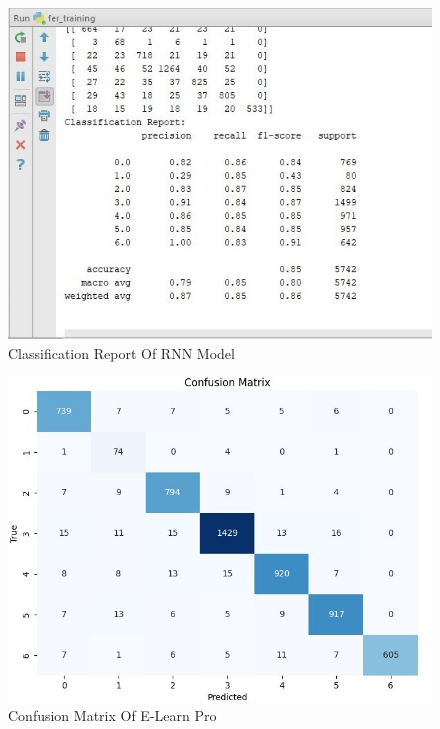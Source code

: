 \begin{figure}[!ht]
\centering
\includegraphics[width=125mm]{rnn.jpeg}
\caption{Classification Report Of RNN Model}
\end{figure} 

\begin{figure}[!ht]
\centering
\includegraphics[width=125mm]{e learn conf.jpeg}
\caption{Confusion Matrix Of E-Learn Pro}
\end{figure} 

